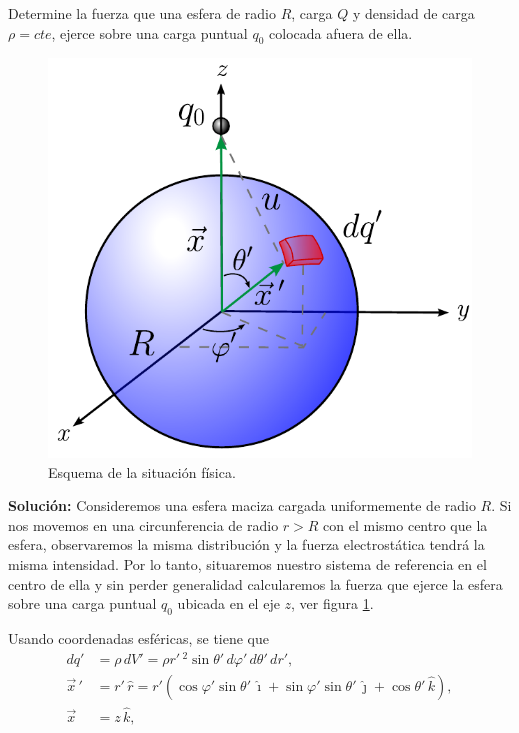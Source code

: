 \begin{ejemplo}
    Determine la fuerza que una esfera de radio $R$, carga $Q$ y densidad de carga $\rho = cte$, ejerce sobre una carga puntual $q_0$ colocada afuera de ella.
    
\begin{figure}[H]
    \centering
    \includegraphics[scale = 0.65]{Figuras/Ej-Distribucion-Carga-3.pdf}
    \caption{Esquema de la situación física.}
    \label{fig:Ej-Distri-Carga-3}
\end{figure}

\textbf{Solución:} Consideremos una esfera maciza cargada uniformemente de radio $R$. Si nos movemos en una circunferencia de radio $r >R$ con el mismo centro que la esfera, observaremos la misma distribución y la fuerza electrostática tendrá la misma intensidad. Por lo tanto, situaremos nuestro sistema de referencia en el centro de ella y sin perder generalidad calcularemos la fuerza que ejerce la esfera sobre una carga puntual $q_0$ ubicada en el eje $z$, ver figura \ref{fig:Ej-Distri-Carga-3}.

Usando coordenadas esféricas, se tiene que
\begin{align*}
    dq' &= \rho \, dV' = \rho r'\,^2 \sin \theta' \,d \varphi' \,d\theta' \,dr', \\
    \Vec{x} \,' &= r' \,\hat{r} = r' (\cos \varphi ' \sin \theta' \,\hat{\imath} + \sin \varphi' \sin \theta' \,\hat{\jmath} + \cos \theta' \,\hat{k}),\\
    \Vec{x} &= z \,\hat{k},
\end{align*}


\end{ejemplo}
